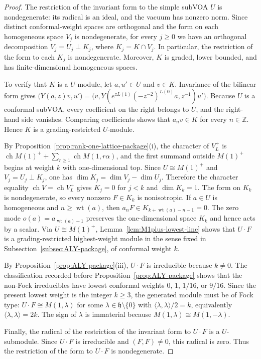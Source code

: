 \documentclass[12pt,leqno]{amsart}
\numberwithin{equation}{section} \newtheorem{thm}{Theorem}[section] \newtheorem{lem}[thm]{Lemma} \newtheorem{ex}[thm]{Example} \newtheorem{prop}[thm]{Proposition} \newtheorem{cor}[thm]{Corollary} \newtheorem{defi}[thm]{Definition} \newtheorem{rmk}[thm]{Remark} \newtheorem{notation}[thm]{Notation}
\newcommand{\wt}{\operatorname{wt}}
\newcommand{\ch}{\operatorname{ch}}
\def\Z{\mathbb{Z}} \def\N{\mathbb{N}} \def\A{\mathbb{A}} \def\C{\mathbb{C}} \def\R{\mathbb{R}} \def\Q{\mathbb{Q}} \def\F{\mathbb{F}}
\begin{document}
\begin{proof}
The restriction of the invariant form to the simple subVOA $U$ is nondegenerate: its radical is an ideal, and the vacuum has nonzero norm. Since distinct conformal-weight spaces are orthogonal and the form on each homogeneous space $V_j$ is nondegenerate, for every $j\ge0$ we have an orthogonal decomposition \(V_j=U_j\perp K_j\), where $K_j=K\cap V_j$. In particular, the restriction of the form to each $K_j$ is nondegenerate. Moreover, $K$ is graded, lower bounded, and has finite-dimensional homogeneous spaces.

To verify that $K$ is a $U$-module, let $a,u'\in U$ and $v\in K$. Invariance of the bilinear form gives \(\bigl(Y(a,z)v,u'\bigr)=\bigl(v,Y(e^{zL(1)}(-z^{-2})^{L(0)}a,z^{-1})u'\bigr).\) Because $U$ is a conformal subVOA, every coefficient on the right belongs to $U$, and the right-hand side vanishes. Comparing coefficients shows that $a_nv\in K$ for every $n\in\Z$. Hence $K$ is a grading-restricted $U$-module.

By Proposition~\ref{prop:rank-one-lattice-package}(i), the character of $V_L^+$ is \(\ch M(1)^++\sum_{r\ge1}\ch M(1,r\alpha)\), and the first summand outside $M(1)^+$ begins at weight $k$ with one-dimensional top. Since $U\cong M(1)^+$ and \(V_j=U_j\perp K_j\), one has \(\dim K_j=\dim V_j-\dim U_j\). Therefore the character equality \(\ch V=\ch V_L^+\) gives $K_j=0$ for $j<k$ and $\dim K_k=1$. The form on $K_k$ is nondegenerate, so every nonzero $F\in K_k$ is nonisotropic. If $a\in U$ is homogeneous and $n\ge\wt(a)$, then \(a_nF\in K_{k+\wt(a)-n-1}=0\). The zero mode $o(a)=a_{\wt(a)-1}$ preserves the one-dimensional space $K_k$ and hence acts by a scalar. Via $U\cong M(1)^+$, Lemma~\ref{lem:M1plus-lowest-line} shows that $U\cdot F$ is a grading-restricted highest-weight module in the sense fixed in Subsection~\ref{subsec:ALY-package}, of conformal weight $k$.

By Proposition~\ref{prop:ALY-package}(iii), $U\cdot F$ is irreducible because $k\ne0$. The classification recorded before Proposition~\ref{prop:ALY-package} shows that the non-Fock irreducibles have lowest conformal weights $0$, $1$, $1/16$, or $9/16$. Since the present lowest weight is the integer $k\ge3$, the generated module must be of Fock type: \(U\cdot F\cong M(1,\lambda)\) for some $\lambda\in\mathfrak h\setminus\{0\}$ with \(\langle\lambda,\lambda\rangle/2=k\), equivalently \(\langle\lambda,\lambda\rangle=2k\). The sign of $\lambda$ is immaterial because $M(1,\lambda)\cong M(1,-\lambda)$.

Finally, the radical of the restriction of the invariant form to $U\cdot F$ is a $U$-submodule. Since $U\cdot F$ is irreducible and $(F,F)\ne0$, this radical is zero. Thus the restriction of the form to $U\cdot F$ is nondegenerate.
\end{proof}
\end{document}
